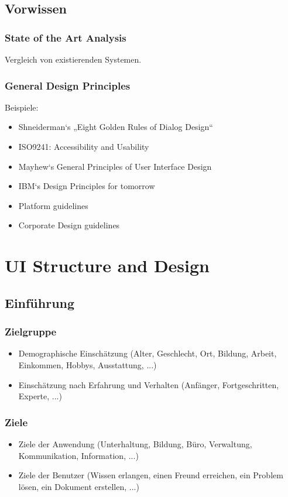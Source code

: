\documentclass[a4paper,10pt]{article}
\begin{document}
\subsection{Vorwissen}

\subsubsection{State of the Art Analysis}
Vergleich von existierenden Systemen.

\subsubsection{General Design Principles}
Beispiele:
\begin{itemize}
	\item Shneiderman‘s „Eight Golden Rules of Dialog Design“
	\item ISO9241: Accessibility and Usability
	\item Mayhew‘s General Principles of User Interface Design
	\item IBM‘s Design Principles for tomorrow
	\item Platform guidelines
	\item Corporate Design guidelines
\end{itemize}

\section{UI Structure and Design}

\subsection{Einführung}
\subsubsection{Zielgruppe}
\begin{itemize}
	\item Demographische Einschätzung (Alter, Geschlecht, Ort, Bildung, Arbeit, Einkommen, Hobbys, Ausstattung, ...)
	\item Einschätzung nach Erfahrung und Verhalten (Anfänger, Fortgeschritten, Experte, ...)
\end{itemize}

\subsubsection{Ziele}
\begin{itemize}
	\item Ziele der Anwendung (Unterhaltung, Bildung, Büro, Verwaltung, Kommunikation, Information, ...)
	\item Ziele der Benutzer (Wissen erlangen, einen Freund erreichen, ein Problem lösen, ein Dokument erstellen, ...)
\end{itemize}
\end{document}
